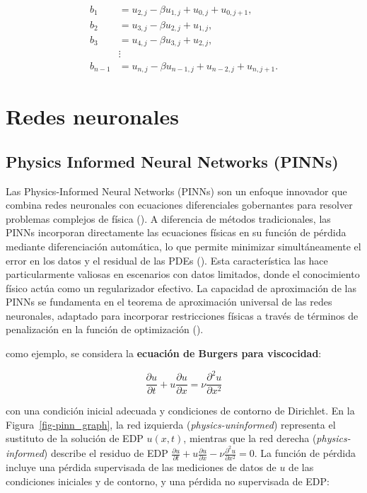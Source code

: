 \documentclass[
  spanish,
  us-letterpaper,
]{scrreprt}
\theoremstyle{definition}
\theoremstyle{plain}
\theoremstyle{remark}
\begin{document}
\begin{align*}
b_1 &= u_{2,j} - \beta u_{1,j} + u_{0,j} + u_{0,j+1}, \\
b_2 &= u_{3,j} - \beta u_{2,j} + u_{1,j}, \\
b_3 &= u_{4,j} - \beta u_{3,j} + u_{2,j}, \\
    &\vdots \\
b_{n-1} &= u_{n,j} - \beta u_{n-1,j} + u_{n-2,j} + u_{n,j+1}.
\end{align*}

\part{Redes neuronales}

\chapter{Physics Informed Neural Networks (PINNs)}\label{sec-pinns}

Las Physics-Informed Neural Networks (PINNs) son un enfoque innovador
que combina redes neuronales con ecuaciones diferenciales gobernantes
para resolver problemas complejos de física
(). A diferencia de
métodos tradicionales, las PINNs incorporan directamente las ecuaciones
físicas en su función de pérdida mediante diferenciación automática, lo
que permite minimizar simultáneamente el error en los datos y el
residual de las PDEs (). Esta característica las hace particularmente
valiosas en escenarios con datos limitados, donde el conocimiento físico
actúa como un regularizador efectivo. La capacidad de aproximación de
las PINNs se fundamenta en el teorema de aproximación universal de las
redes neuronales, adaptado para incorporar restricciones físicas a
través de términos de penalización en la función de optimización
().

como ejemplo, se considera la \textbf{ecuación de Burgers para
viscocidad}:

\[
\frac{\partial u}{\partial t} + u \frac{\partial u}{\partial x} = \nu \frac{\partial^2 u}{\partial x^2}
\]

con una condición inicial adecuada y condiciones de contorno de
Dirichlet. En la Figura~\ref{fig-pinn_graph}, la red izquierda
(\emph{physics-\hspace{0pt}uninformed}) representa el sustituto de la
solución de EDP \(u(x, t)\), mientras que la red derecha
(\emph{physics-\hspace{0pt}informed}) describe el residuo de EDP
\(\frac{\partial u}{\partial t} + u \frac{\partial u}{\partial x} - \nu \frac{\partial^2 u}{\partial x^2} = 0\).
La función de pérdida incluye una pérdida supervisada de las mediciones
de datos de \(u\) de las condiciones iniciales y de contorno, y una
pérdida no supervisada de EDP:
\end{document}
